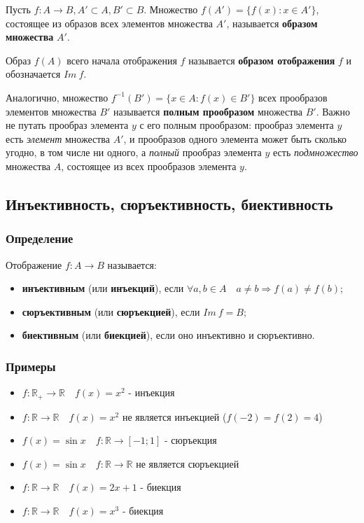 \documentclass{article}
\begin{document}
Пусть $f: A \rightarrow B, A' \subset A, B' \subset B$. Множество $f(A') = \{f(x) : x \in A'\}$, состоящее из образов всех элементов множества $A'$, называется \textbf{образом множества} $A'$.

Образ $f(A)$ всего начала отображения $f$ называется \textbf{образом отображения} $f$ и обозначается $Im~f$.

Аналогично, множество $f^{-1}(B') = \{x \in A : f(x) \in B'\}$ всех прообразов элементов множества $B'$ называется \textbf{полным прообразом} множества $B'$. Важно не путать прообраз элемента $y$ с его полным прообразом: прообраз элемента $y$ есть \textit{элемент} множества $A'$, и прообразов одного элемента может быть сколько угодно, в том числе ни одного, а \textit{полный} прообраз элемента $y$ есть \textit{подмножество} множества $A$, состоящее из всех прообразов элемента $y$.

\subsection{Инъективность, сюръективность, биективность}
\subsubsection*{Определение}
Отображение $f: A \rightarrow B$ называется: \begin{itemize}
	\item \textbf{инъективным} (или \textbf{инъекций}), если $\forall a, b \in A \quad a \neq b \Rightarrow f(a) \neq f(b)$;
	\item \textbf{сюръективным} (или \textbf{сюръекцией}), если $Im~f = B$;
	\item \textbf{биективным} (или \textbf{биекцией}), если оно инъективно и сюръективно.
\end{itemize}

\subsubsection*{Примеры}
\begin{itemize}
	\item $f: \mathbb{R}_+ \rightarrow \mathbb{R} \quad f(x) = x^2$ - инъекция
	\item $f: \mathbb{R} \rightarrow \mathbb{R} \quad f(x) = x^2$ не является инъекцией ($f(-2) = f(2) = 4$)
	\item $f(x) = \sin x \quad f: \mathbb{R} \rightarrow [-1; 1]$ - сюръекция
	\item $f(x) = \sin x \quad f: \mathbb{R} \rightarrow \mathbb{R}$ не является сюръекцией
	\item $f: \mathbb{R} \rightarrow \mathbb{R} \quad f(x) = 2x+1$ - биекция
	\item $f: \mathbb{R} \rightarrow \mathbb{R} \quad f(x) = x^3$ - биекция
\end{itemize}
\end{document}
